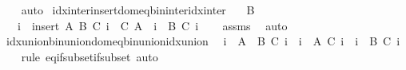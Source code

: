 \begin{isabellebody}
%
\isadelimproof
\ \ %
\endisadelimproof
%
\isatagproof
{}\isamarkupfalse%
\ auto%
\endisatagproof
{\isafoldproof}%
%
\isadelimproof
\isanewline
%
\endisadelimproof
\isanewline
{}\isamarkupfalse%
\ idx{\isacharunderscore}{\kern0pt}inter{\isacharunderscore}{\kern0pt}insert{\isacharunderscore}{\kern0pt}dom{\isacharunderscore}{\kern0pt}eq{\isacharunderscore}{\kern0pt}bin{\isacharunderscore}{\kern0pt}inter{\isacharunderscore}{\kern0pt}idx{\isacharunderscore}{\kern0pt}inter{\isacharcolon}{\kern0pt}\isanewline
\ \ \ {\isachardoublequoteopen}B\ {\isasymnoteq}\ {\isacharbraceleft}{\kern0pt}{\isacharbraceright}{\kern0pt}{\isachardoublequoteclose}\isanewline
\ \ \ {\isachardoublequoteopen}{\isacharparenleft}{\kern0pt}{\isasymInter}i\ {\isasymin}\ insert\ A\ B{\isachardot}{\kern0pt}\ C\ i{\isacharparenright}{\kern0pt}\ {\isacharequal}{\kern0pt}\ C\ A\ {\isasyminter}\ {\isacharparenleft}{\kern0pt}{\isasymInter}i\ {\isasymin}\ B{\isachardot}{\kern0pt}\ C\ i{\isacharparenright}{\kern0pt}{\isachardoublequoteclose}\isanewline
%
\isadelimproof
\ \ %
\endisadelimproof
%
\isatagproof
{}\isamarkupfalse%
\ assms\ \isamarkupfalse%
\ auto%
\endisatagproof
{\isafoldproof}%
%
\isadelimproof
\isanewline
%
\endisadelimproof
\isanewline
{}\isamarkupfalse%
\ idx{\isacharunderscore}{\kern0pt}union{\isacharunderscore}{\kern0pt}bin{\isacharunderscore}{\kern0pt}union{\isacharunderscore}{\kern0pt}dom{\isacharunderscore}{\kern0pt}eq{\isacharunderscore}{\kern0pt}bin{\isacharunderscore}{\kern0pt}union{\isacharunderscore}{\kern0pt}idx{\isacharunderscore}{\kern0pt}union{\isacharcolon}{\kern0pt}\isanewline
\ \ {\isachardoublequoteopen}{\isacharparenleft}{\kern0pt}{\isasymUnion}i\ {\isasymin}\ A\ {\isasymunion}\ B{\isachardot}{\kern0pt}\ C\ i{\isacharparenright}{\kern0pt}\ {\isacharequal}{\kern0pt}\ {\isacharparenleft}{\kern0pt}{\isasymUnion}i\ {\isasymin}\ A{\isachardot}{\kern0pt}\ C\ i{\isacharparenright}{\kern0pt}\ {\isasymunion}\ {\isacharparenleft}{\kern0pt}{\isasymUnion}i\ {\isasymin}\ B{\isachardot}{\kern0pt}\ C\ i{\isacharparenright}{\kern0pt}{\isachardoublequoteclose}\isanewline
%
\isadelimproof
\ \ %
\endisadelimproof
%
\isatagproof
{}\isamarkupfalse%
\ {\isacharparenleft}{\kern0pt}rule\ eq{\isacharunderscore}{\kern0pt}if{\isacharunderscore}{\kern0pt}subset{\isacharunderscore}{\kern0pt}if{\isacharunderscore}{\kern0pt}subset{\isacharparenright}{\kern0pt}\ auto%
\endisatagproof
{\isafoldproof}%
%
\isadelimproof
\isanewline
%
\endisadelimproof
\isanewline
{}\isamarkupfalse%

\end{isabellebody}
